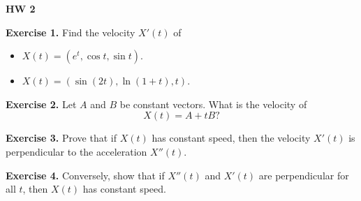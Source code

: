 \documentclass{article}
\begin{document}

\textbf{HW 2}

\textbf{Exercise 1.} Find the velocity $X'(t)$ of
\begin{itemize}
    \item $X(t) = (e^t,\cos t, \sin t)$.
    \item $X(t) = (\sin(2t), \ln(1+t), t)$.
\end{itemize}

\textbf{Exercise 2.} Let $A$ and $B$ be constant vectors. What is the velocity of
\[X(t) = A + tB?\]

\textbf{Exercise 3.} Prove that if $X(t)$ has constant speed, then the velocity $X'(t)$ 
is perpendicular to the acceleration $X''(t)$.

\textbf{Exercise 4.} Conversely, show that if $X''(t)$ and $X'(t)$ are perpendicular for all $t$, then
$X(t)$ has constant speed.
\end{document}
